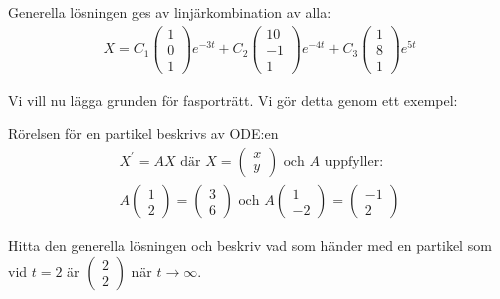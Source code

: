 \noindent Generella lösningen ges av linjärkombination av alla:
\begin{equation*}
  \begin{gathered}
    X = C_1\begin{pmatrix}1\\0\\1\end{pmatrix}e^{-3t}+C_2\begin{pmatrix}10\\-1\\1\end{pmatrix}e^{-4t}+C_3\begin{pmatrix}1\\8\\1\end{pmatrix}e^{5t}
  \end{gathered}
\end{equation*}
\par\bigskip
\noindent Vi vill nu lägga grunden för fasporträtt. Vi gör detta genom ett exempel:
\par\bigskip
\noindent Rörelsen för en partikel beskrivs av ODE:en
\begin{equation*}
  \begin{gathered}
    X^{\prime} = AX \text{ där } X= \begin{pmatrix}x\\y\end{pmatrix}\text{ och $A$ uppfyller}:\\
    A\begin{pmatrix}1\\2\end{pmatrix} = \begin{pmatrix}3\\6\end{pmatrix} \text{ och } A\begin{pmatrix}1\\-2\end{pmatrix} = \begin{pmatrix}-1\\2\end{pmatrix}
  \end{gathered}
\end{equation*}
\par\bigskip
\noindent Hitta den generella lösningen och beskriv vad som händer med en partikel som vid $t=2$ är $\begin{pmatrix}2\\2\end{pmatrix}$ när $t\to\infty$.
